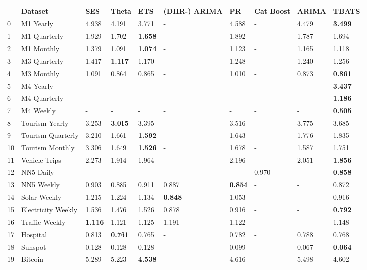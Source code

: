 \begin{tabular}{llllllllll}
\toprule
 & Dataset & SES & Theta & ETS & (DHR-) ARIMA & PR & Cat Boost & ARIMA & TBATS \\
\midrule
0 & M1 Yearly & 4.938 & 4.191 & 3.771 & - & 4.588 & - & 4.479 & \textbf{3.499} \\
1 & M1 Quarterly & 1.929 & 1.702 & \textbf{1.658} & - & 1.892 & - & 1.787 & 1.694 \\
2 & M1 Monthly & 1.379 & 1.091 & \textbf{1.074} & - & 1.123 & - & 1.165 & 1.118 \\
3 & M3 Quarterly & 1.417 & \textbf{1.117} & 1.170 & - & 1.248 & - & 1.240 & 1.256 \\
4 & M3 Monthly & 1.091 & 0.864 & 0.865 & - & 1.010 & - & 0.873 & \textbf{0.861} \\
5 & M4 Yearly & - & - & - & - & - & - & - & \textbf{3.437} \\
6 & M4 Quarterly & - & - & - & - & - & - & - & \textbf{1.186} \\
7 & M4 Weekly & - & - & - & - & - & - & - & \textbf{0.505} \\
8 & Tourism Yearly & 3.253 & \textbf{3.015} & 3.395 & - & 3.516 & - & 3.775 & 3.685 \\
9 & Tourism Quarterly & 3.210 & 1.661 & \textbf{1.592} & - & 1.643 & - & 1.776 & 1.835 \\
10 & Tourism Monthly & 3.306 & 1.649 & \textbf{1.526} & - & 1.678 & - & 1.587 & 1.751 \\
11 & Vehicle Trips & 2.273 & 1.914 & 1.964 & - & 2.196 & - & 2.051 & \textbf{1.856} \\
12 & NN5 Daily & - & - & - & - & - & 0.970 & - & \textbf{0.858} \\
13 & NN5 Weekly & 0.903 & 0.885 & 0.911 & 0.887 & \textbf{0.854} & - & - & 0.872 \\
14 & Solar Weekly & 1.215 & 1.224 & 1.134 & \textbf{0.848} & 1.053 & - & - & 0.916 \\
15 & Electricity Weekly & 1.536 & 1.476 & 1.526 & 0.878 & 0.916 & - & - & \textbf{0.792} \\
16 & Traffic Weekly & \textbf{1.116} & 1.121 & 1.125 & 1.191 & 1.122 & - & - & 1.148 \\
17 & Hospital & 0.813 & \textbf{0.761} & 0.765 & - & 0.782 & - & 0.788 & 0.768 \\
18 & Sunspot & 0.128 & 0.128 & 0.128 & - & 0.099 & - & 0.067 & \textbf{0.064} \\
19 & Bitcoin & 5.289 & 5.223 & \textbf{4.538} & - & 4.616 & - & 5.498 & 4.602 \\

\end{tabular}
